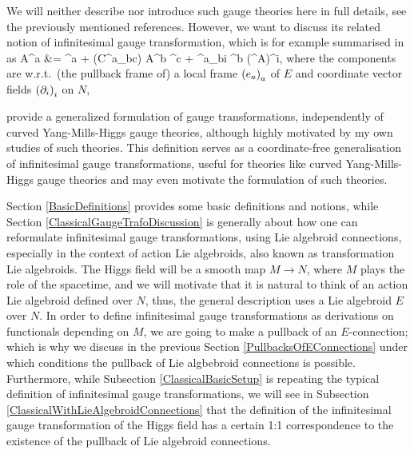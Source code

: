 \documentclass[a4paper,oneside,11pt]{scrartcl} %
\def\bas#1\eas{\begin{align*}#1\end{align*}}
\theoremstyle{plain}
\theoremstyle{remark}
\theoremstyle{definition}
\begin{document}
We will neither describe nor introduce such gauge theories here in full details, see the previously mentioned references. However, we want to discuss its related notion of infinitesimal gauge transformation, which is for example summarised in \cite[Eq.\ (10)]{CurvedYMH} as
\bas
\delta A^a
&=
\varepsilon^a
	+ \mleft(C^a_{bc}\circ\Phi\mright) A^b \varepsilon^c
	+ \omega^a_{bi} \varepsilon^b \mleft(^A\Phi\mright)^i,
\eas
where the components are w.r.t.\ (the pullback frame of) a local frame $\mleft( e_a \mright)_a$ of $E$ and coordinate vector fields $\mleft( \partial_i \mright)_i$ on $N$,

provide a generalized formulation of gauge transformations, independently of curved Yang-Mills-Higgs gauge theories, although highly motivated by my own studies of such theories. This definition serves as a coordinate-free generalisation of infinitesimal gauge transformations, useful for theories like curved Yang-Mills-Higgs gauge theories and may even motivate the formulation of such theories.

Section \ref{BasicDefinitions} provides some basic definitions and notions, while Section \ref{ClassicalGaugeTrafoDiscussion} is generally about how one can reformulate infinitesimal gauge transformations, using Lie algebroid connections, especially in the context of action Lie algebroids, also known as transformation Lie algebroids. The Higgs field will be a smooth map $M \to N$, where $M$ plays the role of the spacetime, and we will motivate that it is natural to think of an action Lie algebroid defined over $N$, thus, the general description uses a Lie algebroid $E$ over $N$. In order to define infinitesimal gauge transformations as derivations on functionals depending on $M$, we are going to make a pullback of an $E$-connection; which is why we discuss in the previous Section \ref{PullbacksOfEConnections} under which conditions the pullback of Lie algbebroid connections is possible. Furthermore, while Subsection \ref{ClassicalBasicSetup} is repeating the typical definition of infinitesimal gauge transformations, we will see in Subsection \ref{ClassicalWithLieAlgebroidConnections} that the definition of the infinitesimal gauge transformation of the Higgs field has a certain 1:1 correspondence to the existence of the pullback of Lie algebroid connections.
\end{document}
